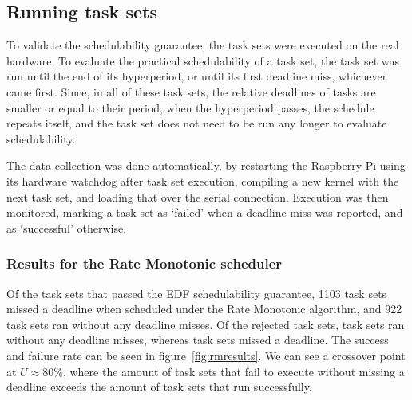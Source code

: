 \subsection{Running task sets}
To validate the schedulability guarantee, the task sets were executed on the real hardware. To evaluate the practical schedulability of a task set, the task set was run until the end of its hyperperiod, or until its first deadline miss, whichever came first. Since, in all of these task sets, the relative deadlines of tasks are smaller or equal to their period, when the hyperperiod passes, the schedule repeats itself, and the task set does not need to be run any longer to evaluate schedulability.

The data collection was done automatically, by restarting the Raspberry Pi using its hardware watchdog after task set execution, compiling a new kernel with the next task set, and loading that over the serial connection. Execution was then monitored, marking a task set as `failed' when a deadline miss was reported, and as `successful' otherwise.

\subsubsection{Results for the Rate Monotonic scheduler}
Of the \totalsuccess{} task sets that passed the EDF schedulability guarantee, 1103 task sets missed a deadline when scheduled under the Rate Monotonic algorithm, and 922 task sets ran without any deadline misses. Of the rejected task sets, \rmfailurepassed{} task sets ran without any deadline misses, whereas \rmfailurefailed{} task sets missed a deadline. The success and failure rate can be seen in figure~\ref{fig:rmresults}. We can see a crossover point at $U \approx 80\%$, where the amount of task sets that fail to execute without missing a deadline exceeds the amount of task sets that run successfully.

